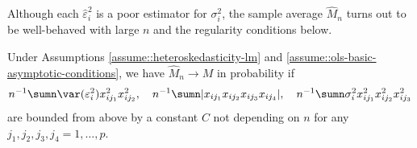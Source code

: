 Although each $\hat{\varepsilon}_{i}^{2}$ is a poor estimator for
$\sigma_{i}^{2}$, the sample average $\hat{M}_{n}$ turns out to
be well-behaved with large $n$ and the regularity conditions below. 


\begin{theorem}\label{thm::ehw-fixeddesign-consistency}
Under Assumptions \ref{assume::heteroskedasticity-lm} and \ref{assume::ols-basic-asymptotic-conditions}, 
we have $\hat{M}_{n}\rightarrow M$ in probability
if
\begin{equation}
\label{thm::ehw-consistency}
n^{-1}\sumn\var(\varepsilon_{i}^{2})x_{ij_1}^2 x_{ij_2}^2,\quad
n^{-1}\sumn |  x_{ij_{1}}x_{ij_{2}}x_{ij_{3}}x_{ij_{4}} |  ,\quad
n^{-1}\sumn\sigma_{i}^{2}x_{ij_{1}}^{2}x_{ij_{2}}^{2}x_{ij_{3}}^{2}
\end{equation}
are bounded from above by a constant $C$ not depending on $n$ for any $j_{1},j_{2},j_{3},j_{4}=1,\ldots,p$. 
\end{theorem}
%
